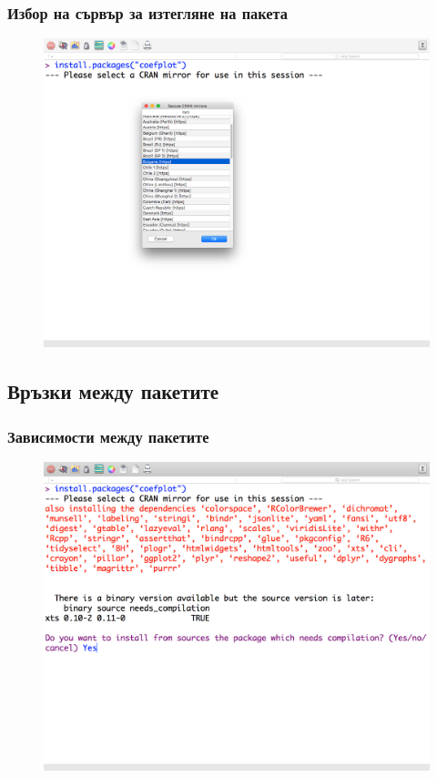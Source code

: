 \documentclass{beamer}
\begin{document}
\begin{frame}
\frametitle{Избор на сървър за изтегляне на пакета}
\begin{figure}[]\includegraphics[width=\textwidth,height=0.75\textheight]{pic0015}\end{figure}
\end{frame}

\subsection{Връзки между пакетите}

\begin{frame}
\frametitle{Зависимости между пакетите}
\begin{figure}[]\includegraphics[width=\textwidth,height=0.75\textheight]{pic0016}\end{figure}
\end{frame}
\end{document}
